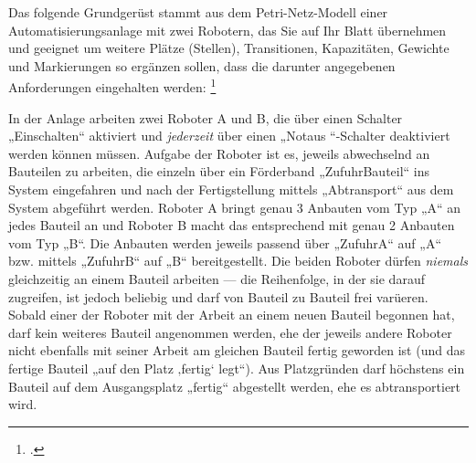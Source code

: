\documentclass{bschlangaul-aufgabe}
\begin{document}

Das folgende Grundgerüst stammt aus dem Petri-Netz-Modell einer
Automatisierungsanlage mit zwei Robotern, das Sie auf Ihr Blatt
übernehmen und geeignet um weitere Plätze (Stellen), Transitionen,
Kapazitäten, Gewichte und Markierungen so ergänzen sollen, dass die
darunter angegebenen Anforderungen eingehalten werden:
\footcite{examen:66116:2015:03}

In der Anlage arbeiten zwei Roboter A und B, die über einen Schalter
„Einschalten“ aktiviert und \emph{jederzeit} über einen „Notaus
“-Schalter deaktiviert werden können müssen. Aufgabe der Roboter ist es,
jeweils abwechselnd an Bauteilen zu arbeiten, die einzeln über ein
Förderband „ZufuhrBauteil“ ins System eingefahren und nach der
Fertigstellung mittels „Abtransport“ aus dem System abgeführt werden.
Roboter A bringt genau 3 Anbauten vom Typ „A“ an jedes Bauteil an und
Roboter B macht das entsprechend mit genau 2 Anbauten vom Typ „B“. Die
Anbauten werden jeweils passend über „ZufuhrA“ auf „A“ bzw. mittels
„ZufuhrB“ auf „B“ bereitgestellt. Die beiden Roboter dürfen
\emph{niemals} gleichzeitig an einem Bauteil arbeiten — die Reihenfolge,
in der sie darauf zugreifen, ist jedoch beliebig und darf von Bauteil zu
Bauteil frei varüeren. Sobald einer der Roboter mit der Arbeit an einem
neuen Bauteil begonnen hat, darf kein weiteres Bauteil angenommen
werden, ehe der jeweils andere Roboter nicht ebenfalls mit seiner Arbeit
am gleichen Bauteil fertig geworden ist (und das fertige Bauteil „auf
den Platz ‚fertig‘ legt“). Aus Platzgründen darf höchstens ein Bauteil
auf dem Ausgangsplatz „fertig“ abgestellt werden, ehe es abtransportiert
wird.
\end{document}
